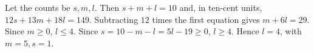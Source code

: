 Let the counts be $s,m,l$. Then $s+m+l=10$ and, in ten-cent units, $12s+13m+18l=149$. Subtracting $12$ times the first equation gives $m+6l=29$. Since $m\ge0$, $l\le4$. Since $s=10-m-l=5l-19\ge0$, $l\ge4$. Hence $\boxed{l=4}$, with $m=5,s=1$.
